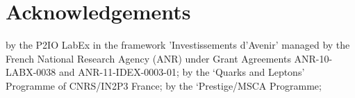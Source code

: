 \documentclass[preprint]{elsarticle}
\begin{document}
\section*{Acknowledgements}
by the P2IO LabEx in the framework 'Investissements d'Avenir' managed by the French National Research Agency (ANR) under Grant Agreements ANR-10-LABX-0038 and ANR-11-IDEX-0003-01; 
by the `Quarks and Leptons' Programme of CNRS/IN2P3 France;
by the `Prestige/MSCA Programme;
\end{document}
